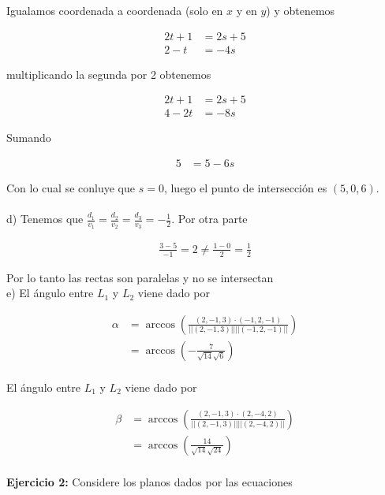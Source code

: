 \documentclass{article}
\theoremstyle{definition}
\begin{document}
Igualamos coordenada a coordenada (solo en $x$ y en $y$) y obtenemos


\begin{align*}
    2t+1 &= 2s+5 \\
    2-t &= -4s
\end{align*}

multiplicando la segunda por 2 obtenemos

\begin{align*}
    2t+1 &= 2s+5 \\
    4-2t &= -8s
\end{align*}

Sumando

\begin{align*}
5 &= 5-6s
\end{align*}

Con lo cual se conluye que $s=0$, luego el punto de intersección es $(5,0,6)$. \\ \\


d) Tenemos que $\displaystyle \frac{d_1}{v_1} =\frac{d_2}{v_2}= \frac{d_3}{v_3} = -\frac{1}{2}$. Por otra parte

\begin{align*}
    \frac{3-5}{-1}=2 \neq \frac{1-0}{2} =\frac{1}{2}
\end{align*}

Por lo tanto las rectas son paralelas y no se intersectan \\

e) El ángulo entre $L_1$ y $L_2$ viene dado por

\begin{align*}
    \alpha &= \arccos\left( \frac{(2,-1,3) \cdot (-1,2,-1)}{||(2,-1,3)|| || (-1,2,-1)||}\right) \\
    &= \arccos\left( -\frac{7}{\sqrt{14}\sqrt{6}}\right) \\
\end{align*}


El ángulo entre $L_1$ y $L_2$ viene dado por

\begin{align*}
    \beta &= \arccos\left( \frac{(2,-1,3) \cdot (2,-4,2)}{||(2,-1,3)|| || (2,-4,2)||}\right) \\
    &= \arccos\left( \frac{14}{\sqrt{14}\sqrt{24}}\right) \\
\end{align*}



\newpage


\textbf{Ejercicio 2:} Considere los planos dados por las ecuaciones
\end{document}
